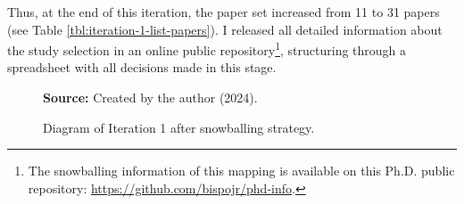 Thus, at the end of this iteration, the paper set increased from 11 to 31 papers (see Table \ref{tbl:iteration-1-list-papers}). I released all detailed information about the study selection in an online public repository\footnote{The snowballing information of this mapping is available on this \gls{Ph.D.} public repository: \url{https://github.com/bispojr/phd-info}.}, structuring through a spreadsheet with all decisions made in this stage.

\begin{figure}[htb]
\centering

\caption{\textmd{Diagram of Iteration 1 after snowballing strategy.}}
\label{fig:second-iteration}

\par\medskip\ABNTEXfontereduzida\selectfont\textbf{Source:} Created by the author (2024).
\end{figure}